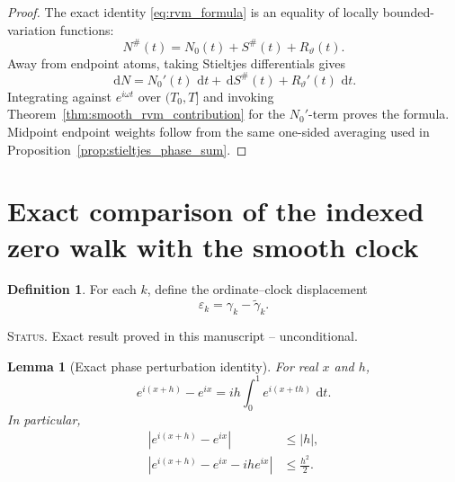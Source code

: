 \documentclass[11pt]{amsart}
\numberwithin{equation}{section}
\theoremstyle{plain}
\newtheorem{lemma}[theorem]{Lemma}
\theoremstyle{definition}
\newtheorem{definition}[theorem]{Definition}
\theoremstyle{remark}
\newcommand{\1}{\mathbf{1}}
\newcommand{\dd}{\,\mathrm{d}}
\newcommand{\statusnote}[1]{%
  \par\smallskip\noindent
  \begingroup\footnotesize\textsc{Status.} #1\endgroup
  \par\smallskip}
\begin{document}
\begin{proof}
The exact identity \eqref{eq:rvm_formula} is an equality of locally
bounded-variation functions:
\begin{equation}
N^{\#}(t)=N_0(t)+S^{\#}(t)+R_\vartheta(t).
\label{eq:rvm_linear_decomposition_proof}
\end{equation}
Away from endpoint atoms, taking Stieltjes differentials gives
\begin{equation}
\dd N
=
N_0'(t)\,\dd t+\dd S^{\#}(t)+R_\vartheta'(t)\,\dd t.
\label{eq:rvm_differential_decomposition}
\end{equation}
Integrating against \(e^{i\omega t}\) over \((T_0,T]\) and invoking
Theorem~\ref{thm:smooth_rvm_contribution} for the \(N_0'\)-term proves
the formula.  Midpoint endpoint weights follow from the same one-sided
averaging used in Proposition~\ref{prop:stieltjes_phase_sum}.
\end{proof}

\section{Exact comparison of the indexed zero walk with the smooth clock}
\label{sec:indexed_rvm_comparison}

\begin{definition}
\label{def:index_displacement}
For each \(k\), define the ordinate--clock displacement
\begin{equation}
\varepsilon_k
=
\gamma_k-\widetilde\gamma_k.
\label{eq:index_displacement}
\end{equation}
\end{definition}

\statusnote{Exact result proved in this manuscript -- unconditional.}
\begin{lemma}[Exact phase perturbation identity]
\label{lem:phase_perturbation}
For real \(x\) and \(h\),
\begin{equation}
e^{i(x+h)}-e^{ix}
=
ih\int_0^1e^{i(x+th)}\,\dd t.
\label{eq:phase_perturbation_integral}
\end{equation}
In particular,
\begin{align}
|e^{i(x+h)}-e^{ix}|
&\leq |h|,
\label{eq:phase_lipschitz}
\\
\left|e^{i(x+h)}-e^{ix}-ihe^{ix}\right|
&\leq\frac{h^2}{2}.
\label{eq:phase_quadratic_remainder}
\end{align}
\end{lemma}
\end{document}
